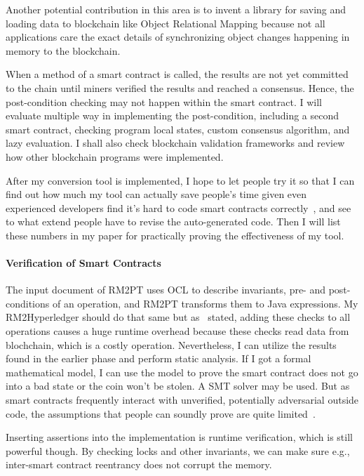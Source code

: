 Another potential contribution in this area is to invent a library for saving and loading data to blockchain like Object Relational Mapping because
not all applications care the exact details of synchronizing object changes happening in memory to the blockchain.

When a method of a smart contract is called, the results are not yet committed to the chain until miners verified the results and reached a consensus. Hence, the post-condition checking may not happen within the smart contract. I will evaluate multiple way in implementing the post-condition, including a second smart contract, checking program local states, custom consensus algorithm, and lazy evaluation.
I shall also check blockchain validation frameworks and review how other blockchain programs were implemented.

After my conversion tool is implemented, I hope to let people try it so that I can find out how much my tool can actually save people's time given even experienced developers find it's hard to code smart contracts correctly~\cite{dao2019challenges}, and see to what extend people have to revise the auto-generated code. Then I will list these numbers in my paper for practically proving the effectiveness of my tool.



\paragraph*{Verification of Smart Contracts}
The input document of RM2PT uses OCL to describe invariants, pre- and post-conditions of an operation, and RM2PT transforms them to Java expressions.
My RM2Hyperledger should do that same but as~\cite{li2020securing} stated, adding these checks to all operations causes a huge runtime overhead because these checks read data from blochchain, which is a costly operation.
Nevertheless, I can utilize the results found in the earlier phase and perform static analysis.
If I got a formal mathematical model, I can use the model to prove the smart contract does not go into a bad state or the coin won't be stolen.
A SMT solver may be used.
But as smart contracts frequently interact with unverified, potentially adversarial outside code,
the assumptions that people can soundly prove are quite limited~\cite{bram2021rich}.

Inserting assertions into the implementation is runtime verification, which is still powerful though.
By checking locks and other invariants, we can make sure e.g., inter-smart contract reentrancy does not corrupt the memory.


